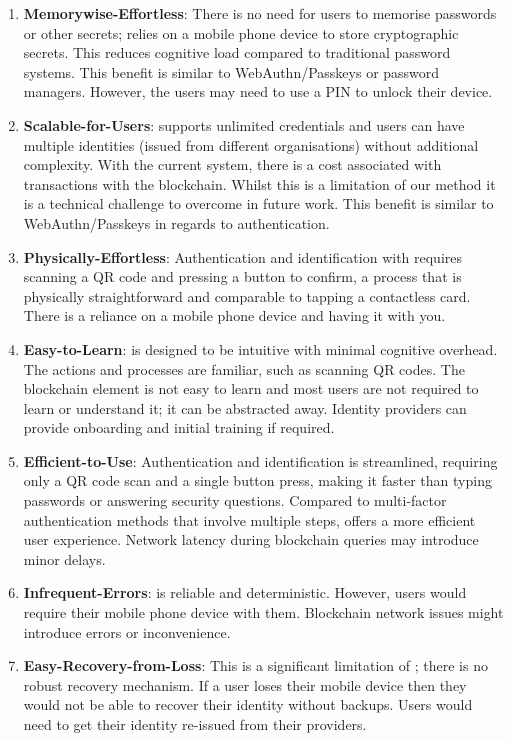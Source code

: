 \begin{enumerate}
    \item \textbf{Memorywise-Effortless}: There is no need for users to memorise passwords or other secrets; \deeid relies on a mobile phone device to store cryptographic secrets. This reduces cognitive load compared to traditional password systems. This benefit is similar to WebAuthn/Passkeys or password managers. However, the users may need to use a PIN to unlock their device.

    \item \textbf{Scalable-for-Users}: \deeid supports unlimited credentials and users can have multiple identities (issued from different organisations) without additional complexity. With the current system, there is a cost associated with transactions with the blockchain. Whilst this is a limitation of our method it is a technical challenge to overcome in future work. This benefit is similar to WebAuthn/Passkeys in regards to authentication.

    \item \textbf{Physically-Effortless}: Authentication and identification with \deeid requires scanning a QR code and pressing a button to confirm, a process that is physically straightforward and comparable to tapping a contactless card. There is a reliance on a mobile phone device and having it with you.

    \item \textbf{Easy-to-Learn}: \deeid is designed to be intuitive with minimal cognitive overhead. The actions and processes are familiar, such as scanning QR codes. The blockchain element is not easy to learn and most users are not required to learn or understand it; it can be abstracted away. Identity providers can provide onboarding and initial training if required.

    \item \textbf{Efficient-to-Use}: Authentication and identification is streamlined, requiring only a QR code scan and a single button press, making it faster than typing passwords or answering security questions. Compared to multi-factor authentication methods that involve multiple steps, \deeid offers a more efficient user experience. Network latency during blockchain queries may introduce minor delays.

    \item \textbf{Infrequent-Errors}: \deeid is reliable and deterministic. However, users would require their mobile phone device with them. Blockchain network issues might introduce errors or inconvenience.

    \item \textbf{Easy-Recovery-from-Loss}: This is a significant limitation of \deeid; there is no robust recovery mechanism. If a user loses their mobile device then they would not be able to recover their identity without backups. Users would need to get their identity re-issued from their providers.
\end{enumerate}


